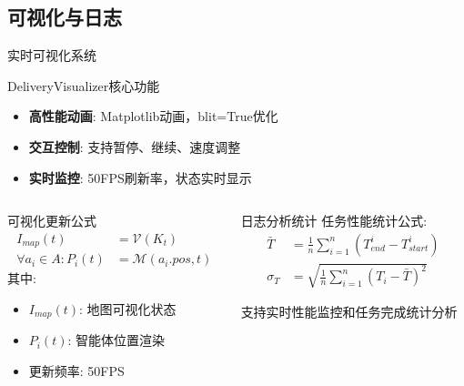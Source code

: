 \documentclass[
10pt,
aspectratio=169,
]{beamer}
\begin{document}
\subsection{可视化与日志}
\begin{frame}{实时可视化系统}
    \begin{block}{DeliveryVisualizer核心功能}
        \begin{itemize}
            \item \textbf{高性能动画}: Matplotlib动画，blit=True优化
            \item \textbf{交互控制}: 支持暂停、继续、速度调整
            \item \textbf{实时监控}: 50FPS刷新率，状态实时显示
        \end{itemize}
    \end{block}
    
    \begin{columns}
        \begin{column}{0.5\textwidth}
            \begin{exampleblock}{可视化更新公式}
                \begin{align}
                    I_{map}(t) &= \mathcal{V}(K_t) \\
                    \forall a_i \in A: P_i(t) &= \mathcal{M}(a_i.pos, t)
                \end{align}
                其中:
                \begin{itemize}
                    \item $I_{map}(t)$: 地图可视化状态
                    \item $P_i(t)$: 智能体位置渲染
                    \item 更新频率: 50FPS
                \end{itemize}
            \end{exampleblock}
        \end{column}
        \begin{column}{0.5\textwidth}
            \begin{alertblock}{日志分析统计}
                任务性能统计公式:
                \begin{align}
                \bar{T} &= \frac{1}{n}\sum_{i=1}^{n}(T_{end}^i - T_{start}^i) \\
                \sigma_T &= \sqrt{\frac{1}{n}\sum_{i=1}^{n}(T_i - \bar{T})^2}
                \end{align}
                
                支持实时性能监控和任务完成统计分析
            \end{alertblock}
        \end{column}
    \end{columns}
\end{frame}
\end{document}
